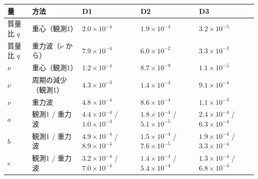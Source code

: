 \documentclass[
  a4paper,
]{ltjsarticle}
\newcounter{none} %
\begin{document}
{\def\LTcaptype{none} %
\begin{longtable}[]{@{}
  >{\raggedright\arraybackslash}p{}
  >{\raggedright\arraybackslash}p{}
  >{\raggedright\arraybackslash}p{}
  >{\raggedright\arraybackslash}p{}
  >{\raggedright\arraybackslash}p{}@{}}
\toprule\noalign{}
\begin{minipage}[b]{\linewidth}\raggedright
量
\end{minipage} & \begin{minipage}[b]{\linewidth}\raggedright
方法
\end{minipage} & \begin{minipage}[b]{\linewidth}\raggedright
D1
\end{minipage} & \begin{minipage}[b]{\linewidth}\raggedright
D2
\end{minipage} & \begin{minipage}[b]{\linewidth}\raggedright
D3
\end{minipage} \\
\midrule\noalign{}
\endhead
\bottomrule\noalign{}
\endlastfoot
質量比 \(q\) & 重心（観測1） & \(2.0\times10^{-4}\) &
\(1.9\times10^{-4}\) & \(3.2\times10^{-5}\) \\
質量比 \(q\) & 重力波（\(\nu\) から） & \(7.9\times10^{-4}\) &
\(6.0\times10^{-2}\) & \(3.3\times10^{-3}\) \\
\(\nu\) & 重心（観測1） & \(1.2\times10^{-4}\) & \(8.7\times10^{-9}\) &
\(1.1\times10^{-5}\) \\
\(\nu\) & 周期の減少（観測1） & \(4.3\times10^{-3}\) &
\(1.4\times10^{-4}\) & \(9.1\times10^{-4}\) \\
\(\nu\) & 重力波 & \(4.8\times10^{-4}\) & \(8.6\times10^{-4}\) &
\(1.1\times10^{-3}\) \\
\(a\) & 観測1 / 重力波 & \(4.4\times10^{-4}\) / \(1.0\times10^{-3}\) &
\(1.8\times10^{-4}\) / \(5.1\times10^{-5}\) & \(2.4\times10^{-4}\) /
\(6.3\times10^{-4}\) \\
\(b\) & 観測1 / 重力波 & \(4.9\times10^{-4}\) / \(8.9\times10^{-4}\) &
\(1.5\times10^{-4}\) / \(7.6\times10^{-5}\) & \(1.9\times10^{-4}\) /
\(3.3\times10^{-4}\) \\
\(e\) & 観測1 / 重力波 & \(3.2\times10^{-4}\) / \(7.0\times10^{-4}\) &
\(1.4\times10^{-4}\) / \(5.4\times10^{-4}\) & \(1.3\times10^{-4}\) /
\(6.8\times10^{-4}\) \\

\end{longtable}}
\end{document}
